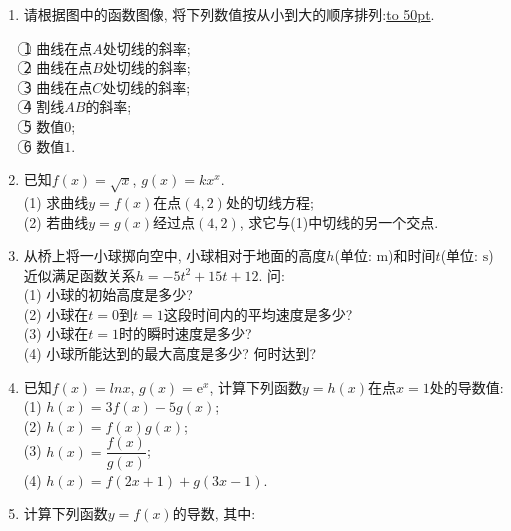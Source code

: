 \documentclass[10pt,a4paper]{article}
\newcommand{\blank}[1]{\underline{\hbox to #1pt{}}}
\begin{document}
\begin{enumerate}[1.]
\item 请根据图中的函数图像, 将下列数值按从小到大的顺序排列:\blank{50}.
\begin{center}
\end{center}
\textcircled{1} 曲线在点$A$处切线的斜率;\\
\textcircled{2} 曲线在点$B$处切线的斜率;\\
\textcircled{3} 曲线在点$C$处切线的斜率;\\
\textcircled{4} 割线$AB$的斜率;\\
\textcircled{5} 数值$0$;\\
\textcircled{6} 数值$1$.
\item 已知$f(x)=\sqrt{x}$, $g(x)=kx^x$.\\
(1) 求曲线$y=f(x)$在点$(4,2)$处的切线方程;\\
(2) 若曲线$y=g(x)$经过点$(4,2)$, 求它与(1)中切线的另一个交点.
\item 从桥上将一小球掷向空中, 小球相对于地面的高度$h$(单位: $\text{m}$)和时间$t$(单位: $\text{s}$)近似满足函数关系$h=-5t^2+15t+12$. 问:\\
(1) 小球的初始高度是多少?\\
(2) 小球在$t=0$到$t=1$这段时间内的平均速度是多少?\\
(3) 小球在$t=1$时的瞬时速度是多少?\\
(4) 小球所能达到的最大高度是多少? 何时达到?
\item 已知$f(x)=lnx$, $g(x)=\mathrm{e}^x$, 计算下列函数$y=h(x)$在点$x=1$处的导数值:\\
(1) $h(x)=3f(x)-5g(x)$;\\
(2) $h(x)=f(x)g(x)$;\\
(3) $h(x)=\dfrac{f(x)}{g(x)}$;\\
(4) $h(x)=f(2x+1)+g(3x-1)$.
\item 计算下列函数$y=f(x)$的导数, 其中:\\

\end{enumerate}
\end{document}
